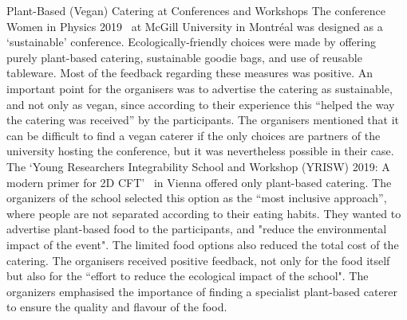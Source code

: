 \documentclass[../SustainableHEP.tex]{subfiles}
\begin{document}
\begin{bestpractice}{Plant-Based (Vegan) Catering at Conferences and Workshops}%
    The conference Women in Physics 2019~\cite{WIPC} at McGill University in Montréal was designed as a `sustainable' conference. Ecologically-friendly choices were made by offering purely plant-based catering, sustainable goodie bags, and use of reusable tableware. Most of the feedback regarding these measures was positive. An important point for the organisers was to advertise the catering as sustainable, and not only as vegan, since according to their experience this ``helped the way the catering was received'' by the participants. The organisers mentioned that it can be difficult to find a vegan caterer if the only choices are partners of the university hosting the conference, but it was nevertheless possible in their case.\\

   The `Young Researchers Integrability School and Workshop (YRISW) 2019: A modern primer for 2D CFT'~\cite{YRISW} in Vienna offered only plant-based catering. The organizers of the school selected this option as the ``most inclusive approach'', where people are not separated according to their eating habits. They wanted to advertise plant-based food to the participants, and "reduce the environmental impact of the event". The limited food options also reduced the total cost of the catering. The organisers received positive feedback, not only for the food itself but also for the ``effort to reduce the ecological impact of the school". The organizers emphasised the importance of finding a specialist plant-based caterer to ensure the quality and flavour of the food.
\end{bestpractice}
\end{document}
